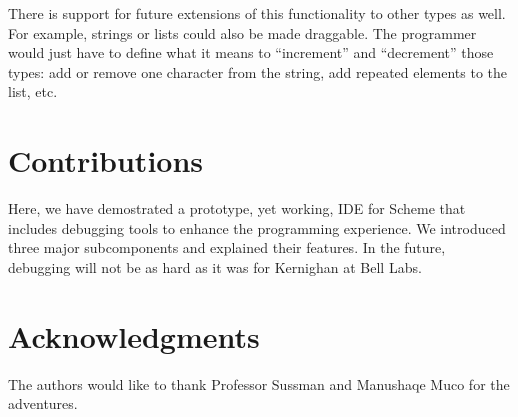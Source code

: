 \documentclass[10pt,journal,compsoc]{IEEEtran}
\begin{document}
There is support for future extensions of this functionality to other types as well. For example, strings or lists could also be made draggable. The programmer would just have to define what it means to “increment” and “decrement” those types: add or remove one character from the string, add repeated elements to the list, etc. 
		
		\section{Contributions}
		Here, we have demostrated a prototype, yet working, IDE for Scheme that includes debugging tools to enhance the programming experience. We introduced three major subcomponents and explained their features. In the future, debugging will not be as hard as it was for Kernighan at Bell Labs.
		
		\section{Acknowledgments}
		The authors would like to thank Professor Sussman and Manushaqe Muco for the adventures.
		
\end{document}

